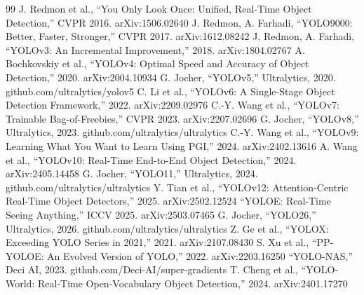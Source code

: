 \begin{thebibliography}{99}
 J. Redmon et al., ``You Only Look Once: Unified, Real-Time Object Detection,'' CVPR 2016. arXiv:1506.02640
 J. Redmon, A. Farhadi, ``YOLO9000: Better, Faster, Stronger,'' CVPR 2017. arXiv:1612.08242
 J. Redmon, A. Farhadi, ``YOLOv3: An Incremental Improvement,'' 2018. arXiv:1804.02767
 A. Bochkovskiy et al., ``YOLOv4: Optimal Speed and Accuracy of Object Detection,'' 2020. arXiv:2004.10934
 G. Jocher, ``YOLOv5,'' Ultralytics, 2020. github.com/ultralytics/yolov5
 C. Li et al., ``YOLOv6: A Single-Stage Object Detection Framework,'' 2022. arXiv:2209.02976
 C.-Y. Wang et al., ``YOLOv7: Trainable Bag-of-Freebies,'' CVPR 2023. arXiv:2207.02696
 G. Jocher, ``YOLOv8,'' Ultralytics, 2023. github.com/ultralytics/ultralytics
 C.-Y. Wang et al., ``YOLOv9: Learning What You Want to Learn Using PGI,'' 2024. arXiv:2402.13616
 A. Wang et al., ``YOLOv10: Real-Time End-to-End Object Detection,'' 2024. arXiv:2405.14458
 G. Jocher, ``YOLO11,'' Ultralytics, 2024. github.com/ultralytics/ultralytics
 Y. Tian et al., ``YOLOv12: Attention-Centric Real-Time Object Detectors,'' 2025. arXiv:2502.12524
 ``YOLOE: Real-Time Seeing Anything,'' ICCV 2025. arXiv:2503.07465
 G. Jocher, ``YOLO26,'' Ultralytics, 2026. github.com/ultralytics/ultralytics
 Z. Ge et al., ``YOLOX: Exceeding YOLO Series in 2021,'' 2021. arXiv:2107.08430
 S. Xu et al., ``PP-YOLOE: An Evolved Version of YOLO,'' 2022. arXiv:2203.16250
 ``YOLO-NAS,'' Deci AI, 2023. github.com/Deci-AI/super-gradients
 T. Cheng et al., ``YOLO-World: Real-Time Open-Vocabulary Object Detection,'' 2024. arXiv:2401.17270
\end{thebibliography}
